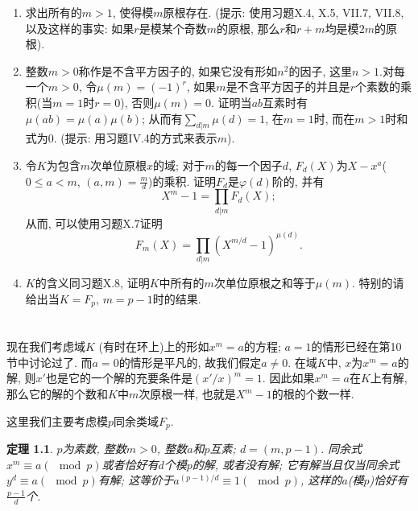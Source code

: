 \documentclass[12pt,a4paper]{book} %
\newtheorem{theorem}{定理}
\theoremstyle{remark}
\theoremstyle{example}
\theoremstyle{lemma}
\theoremstyle{corollary}
\numberwithin{theorem}{chapter}
\begin{document}
\begin{enumerate}
\begin{proof}
假设结论对于$n$成立,对于$n+1$来说,
由于
\[
(1+px)^{p^n} \equiv (1 + p^{n+1}x)(\mod{p^{n+2}}),
\]
于是
\[
(1 + px)^{p^{n+1}}=[(1+px)^{p^n}]^p \equiv (1 + p^{n+1}x)[(1+px)^{p^n}]^{p-1} (\mod{p^{n+2}}),
\]
另一方面
\[
(1 + p^{n+1}x)^p \equiv 1 + p^{n+2}x (\mod{p^{n+3}}),
\]

\end{proof}

\item 求出所有的$m > 1$, 使得模$m$原根存在. (提示: 使用习题X.4, X.5, VII.7, VII.8, 以及这样的事实: 如果$r$是模某个奇数$m$的原根, 那么$r$和$r + m$均是模$2m$的原根).

\item 整数$m > 0$称作是不含平方因子的, 如果它没有形如$n^2$的因子, 这里$n > 1$.对每一个$m > 0$, 令$\mu(m) = (-1)^r$, 如果$m$是不含平方因子的并且是$r$个素数的乘积(当$m = 1$时$r = 0$), 否则$\mu(m) = 0$. 证明当$a$$b$互素时有$\mu(ab) = \mu(a)\mu(b)$; 从而有$\sum_{d | m}{\mu(d)} = 1$, 在$m = 1$时, 而在$m > 1$时和式为$0$. (提示: 用习题IV.4的方式来表示$m$).

\item 令$K$为包含$m$次单位原根$x$的域; 对于$m$的每一个因子$d$, $F_d(X)$为$X - x^a$($0 \le a < m$, $(a, m) = \frac{m}{d}$)的乘积. 证明$F_d$是$\varphi(d)$阶的, 并有
\[
X^m - 1 = \prod_{d | m}{F_d(X)};
\]
从而, 可以使用习题X.7证明
\[
F_m(X) = \prod_{d|m}{(X^{m/d} - 1)^{\mu(d)}}.
\]

\item $K$的含义同习题X.8, 证明$K$中所有的$m$次单位原根之和等于$\mu(m)$. 特别的请给出当$K = F_p$, $m = p - 1$时的结果.
\end{enumerate}

\chapter{} \label{chapter:11}
现在我们考虑域$K$ (有时在环上)上的形如$x^m = a$的方程; $a = 1$的情形已经在第10节中讨论过了. 而$a = 0$的情形是平凡的, 故我们假定$a \neq 0$. 在域$K$中, $x$为$x^m = a$的解, 则$x'$也是它的一个解的充要条件是$(x' / x)^m = 1$. 因此如果$x^m = a$在$K$上有解, 那么它的解的个数和$K$中$m$次原根一样, 也就是$X^m - 1$的根的个数一样.

这里我们主要考虑模$p$同余类域$F_p$.

\begin{theorem}
$p$为素数, 整数$m > 0$, 整数$a$和$p$互素; $d = (m, p - 1)$. 同余式$x^m \equiv a (\mod p)$或者恰好有$d$个模$p$的解, 或者没有解; 它有解当且仅当同余式$y^d \equiv a (\mod p)$有解; 这等价于$a^{(p - 1) / d} \equiv 1 (\mod p)$, 这样的$a$(模$p$)恰好有$\frac{p - 1}{d}$个.
\end{theorem}
\end{document}
